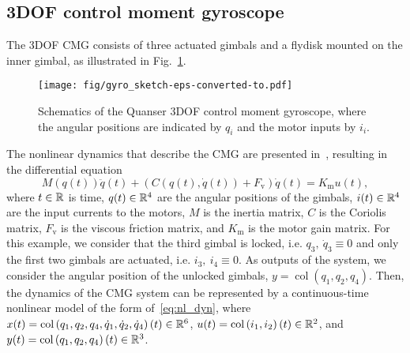     \subsection{3DOF control moment gyroscope}
    The 3DOF CMG consists of three actuated gimbals and a flydisk mounted on the inner gimbal, as illustrated in Fig.~\ref{fig:geom_gyro}.
    \begin{figure}[b]
        \centering
        \texttt{[image: fig/gyro\_sketch-eps-converted-to.pdf]}
        \caption{Schematics of the Quanser 3DOF control moment gyroscope, where the angular positions are indicated by $q_i$ and the motor inputs by $i_i$.}
        \label{fig:geom_gyro}
    \end{figure}
    The nonlinear dynamics that describe the CMG are presented in~\citep{5841d138cdd94f17aaa413781677ac2a}, resulting in the differential equation
    \begin{equation}
        M(q(t))\ddot{q}(t) + \left( C\left(q(t), \dot{q}(t) \right) + F_\mathrm{v} \right) \dot{q}(t) = K_\mathrm{m} u(t),
    \end{equation}
    where $t \in \mathbb{R}$ is time, $q(t) \in \mathbb{R}^4$ are the angular positions of the gimbals, $i(t) \in \mathbb{R}^4$ are the input currents to the motors, $M$ is the inertia matrix, $C$ is the Coriolis matrix, $F_\mathrm{v}$ is the viscous friction matrix, and $K_\mathrm{m}$ is the motor gain matrix. For this example, we consider that the third gimbal is locked, i.e. $q_3, \ \dot{q}_3 \equiv 0$ %
    and only the first two gimbals are actuated, i.e. $i_3, \ i_4 \equiv 0$. %
    As outputs of the system, we consider the angular position of the unlocked gimbals, $y = \operatorname{col}\left(q_1, q_2, q_4 \right)$. Then, the dynamics of the CMG system can be represented by a continuous-time nonlinear model of the form of~\eqref{eq:nl_dyn}, where $x(t) = \operatorname{col}\left(q_1, q_2, q_4, \dot{q}_1, \dot{q}_2, \dot{q}_4 \right)(t) \in \mathbb{R}^6$, $u(t) = \operatorname{col}\left(i_1, i_2 \right)(t) \in \mathbb{R}^2$, and $y(t) = \operatorname{col}\left(q_1, q_2, q_4 \right)(t) \in \mathbb{R}^3$.

